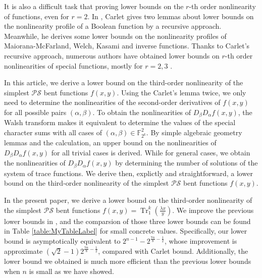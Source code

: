 \documentclass{article}
\newcommand{\F}{\mathbb{F}}
\newcommand{\0}{\textbf{0}}
\newcommand{\1}{\textbf{1}}
\newcommand{\TRACE}{\operatorname{Tr}_1^k}
\theoremstyle{plain}
\begin{document}
    It is also a difficult task that proving lower bounds on the $ r $-th order nonlinearity of functions, even for $ r=2 $. 
    In \cite{Carlet2008lowbound_NL_profile}, Carlet gives two lemmas about lower bounds on the nonlinearity profile of a Boolean function by a recursive approach. Meanwhile, he derives some lower bounds on the nonlinearity profiles of Maiorana-McFarland, Welch, Kasami and inverse functions. 
    Thanks to Carlet's recursive approach, numerous authors have obtained lower bounds on $ r $-th order nonlinearities of special functions, mostly for $ r=2,3 $ \cite{YanT2020NL_2,Liu2023NL_2,TangYZZ2020NL_2bent,SihemKJ2020NL_2cubic,SunW2009NL_2,SarkarG2009NL_2MM,GangopadhyayST2010NL_2,GodeG2010NL_3Kasami,SunW2011NL_2,TangCT2013NL_2bent,Singh2014NL_3_biquadratic,GaoT2017NL_2_MM}. 

    In this article, we derive a lower bound on the third-order nonlinearity of the simplest $ \mathcal{PS} $ bent functions $ f(x,y) $.  
    Using the Carlet's lemma twice, we only need to determine the nonlinearities of the second-order derivatives of $ f(x,y) $ for all possible pairs $ (\alpha,\beta) $. 
    To obtain the nonlinearities of $ D_{\beta}D_{\alpha}f(x,y) $, the Walsh transform makes it equivalent to determine the values of the special character sums with all cases of $ (\alpha,\beta)\in\F_{2^k}^2 $. 
    By simple algebraic geometry lemmas and the calculation, an upper bound on the nonlinearities of $ D_{\beta}D_{\alpha}f(x,y) $ for all trivial cases is derived. 
    While for general cases, we obtain the nonlinearities of $ D_{\beta}D_{\alpha}f(x,y) $ by determining the number of solutions of the system of trace functions. 
    We derive then, explictly and straightforward, a lower bound on the third-order nonlinearity of the simplest $ \mathcal{PS} $ bent functions $ f(x,y) $. 

    In the present paper, we derive a lower bound on the third-order nonlinearity of the simplest $ \mathcal{PS} $ bent functions $ f(x,y)=\TRACE\left( \frac{\lambda x}{y} \right) $. We improve the previous lower bounds in \cite{TangCT2013NL_2bent,Carlet2011NL_Profile_Dillon}, and the comparsion of those three lower bounds can be found in Table \ref{table:MyTableLabel} for small concrete values. 
    Specifically, our lower bound is asymptotically equivalent to $ 2^{n-1}-2^{\frac{7n}{8}-\frac{1}{2}} $, whose 
    improvement is approximate $ (\sqrt{2}-1)2^{\frac{7n}{8}-\frac{1}{2}} $, compared with Carlet bound. 
    Additionally, the lower bound we obtained is much more efficient than the previous lower bounds when $ n $ is small as we have showed.  
\end{document}
